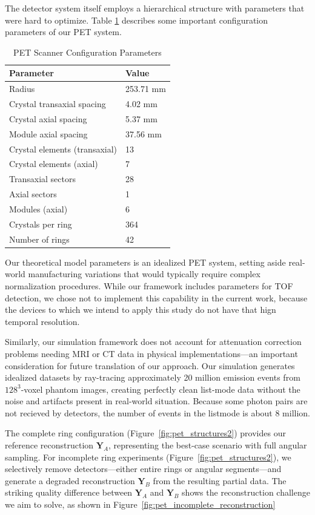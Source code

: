 \documentclass[
reprint,
superscriptaddress,
nofootinbib,
amsmath,amssymb,
aps,
prd,
]{revtex4-2}
\begin{document}
The detector system itself employs a hierarchical structure with parameters that were hard to optimize. Table \ref{tab:detector_params} describes some important configuration parameters of our PET system.

\begin{table}[htbp]
    \centering
    \caption{PET Scanner Configuration Parameters}
    \label{tab:detector_params}
    \begin{tabular}{l l}
    \toprule
    \textbf{Parameter} & \textbf{Value} \\
    \midrule
    Radius & 253.71 mm \\
    Crystal transaxial spacing & 4.02 mm \\
    Crystal axial spacing & 5.37 mm \\
    Module axial spacing & 37.56 mm \\
    Crystal elements (transaxial) & 13 \\
    Crystal elements (axial) & 7 \\
    Transaxial sectors & 28 \\
    Axial sectors & 1 \\
    Modules (axial) & 6 \\
    Crystals per ring & 364 \\
    Number of rings & 42 \\
    \bottomrule
    \end{tabular}
\end{table}

Our theoretical model parameters is an idealized PET system, setting aside real-world manufacturing variations that would typically require complex normalization procedures. 
While our framework includes parameters for TOF detection, we chose not to implement this capability in the current work, because the devices to which we intend to apply this study do not have that hign temporal resolution. 

Similarly, our simulation framework does not account for attenuation correction problems needing MRI or CT data in physical implementations—an important consideration for future translation of our approach. Our simulation generates idealized datasets by ray-tracing approximately 20 million emission events from $128^3$-voxel phantom images, creating perfectly clean list-mode data without the noise and artifacts present in real-world situation. Because some photon pairs are not recieved by detectors, the number of events in the listmode is about 8 million.

The complete ring configuration (Figure~\ref{fig:pet_structures2}) provides our reference reconstruction $\mathbf{Y}_A$, representing the best-case scenario with full angular sampling. For incomplete ring experiments (Figure~\ref{fig:pet_structures2}), we selectively remove detectors—either entire rings or angular segments—and generate a degraded reconstruction $\mathbf{Y}_B$ from the resulting partial data. The striking quality difference between $\mathbf{Y}_A$ and $\mathbf{Y}_B$ shows the reconstruction challenge we aim to solve, as shown in Figure~\ref{fig:pet_incomplete_reconstruction}
\end{document}
